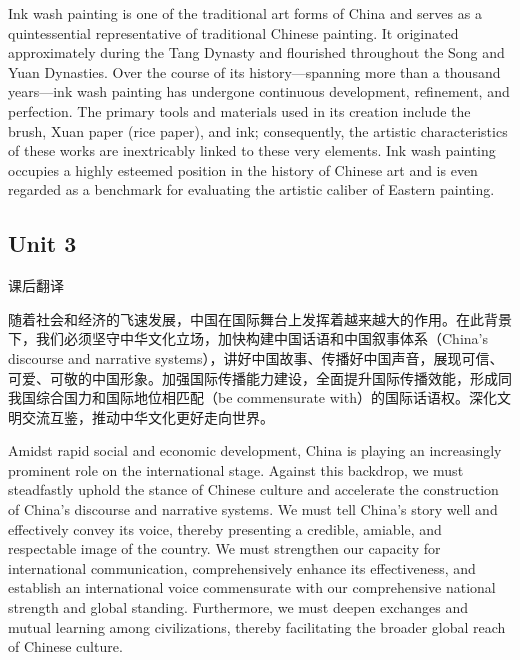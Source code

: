 \begin{solution}

Ink wash painting is one of the traditional art forms of China and serves as a quintessential representative of traditional Chinese painting. It originated approximately during the Tang Dynasty and flourished throughout the Song and Yuan Dynasties. Over the course of its history—spanning more than a thousand years—ink wash painting has undergone continuous development, refinement, and perfection. The primary tools and materials used in its creation include the brush, Xuan paper (rice paper), and ink; consequently, the artistic characteristics of these works are inextricably linked to these very elements. Ink wash painting occupies a highly esteemed position in the history of Chinese art and is even regarded as a benchmark for evaluating the artistic caliber of Eastern painting.

\end{solution}

\subsection{Unit 3}

\begin{question}{课后翻译}
	
随着社会和经济的飞速发展，中国在国际舞台上发挥着越来越大的作用。在此背景下，我们必须坚守中华文化立场，加快构建中国话语和中国叙事体系（China's discourse and narrative systems），讲好中国故事、传播好中国声音，展现可信、可爱、可敬的中国形象。加强国际传播能力建设，全面提升国际传播效能，形成同我国综合国力和国际地位相匹配（be commensurate with）的国际话语权。深化文明交流互鉴，推动中华文化更好走向世界。
	
\end{question}


\begin{solution}

Amidst rapid social and economic development, China is playing an increasingly prominent role on the international stage. Against this backdrop, we must steadfastly uphold the stance of Chinese culture and accelerate the construction of China's discourse and narrative systems. We must tell China's story well and effectively convey its voice, thereby presenting a credible, amiable, and respectable image of the country. We must strengthen our capacity for international communication, comprehensively enhance its effectiveness, and establish an international voice commensurate with our comprehensive national strength and global standing. Furthermore, we must deepen exchanges and mutual learning among civilizations, thereby facilitating the broader global reach of Chinese culture.

\end{solution}


